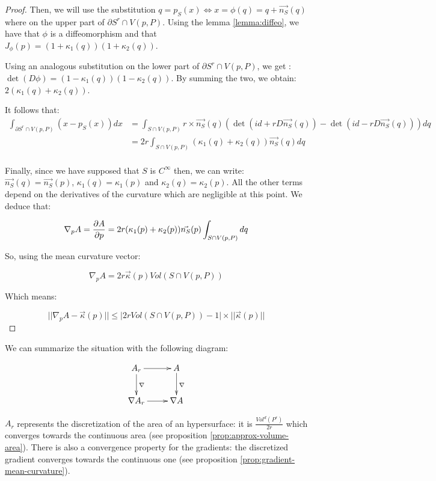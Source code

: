 \begin{proof}
Then, we will use the substitution $ q = p_S(x) \iff x = \phi(q) = q +
\vec{n_S}(q) $ where on the upper part of $ \partial{S^r} \cap V(p, P) $. Using
the lemma \ref{lemma:diffeo}, we have that $ \phi $ is a diffeomorphism and that
$ J_\phi(p) = (1 + \kappa_1(q)) (1 + \kappa_2(q)) $.

Using an analogous substitution on the lower part of $ \partial{S^r} \cap V(p,
P) $, we get : $ \det (D \phi) = (1 - \kappa_1(q)) (1 - \kappa_2(q)) $. By
summing the two, we obtain: $ 2 (\kappa_1(q) + \kappa_2(q)) $.

It follows that:
\begin{align*}
    \int_{\partial{S^r} \cap V(p, P)} (x - p_S(x)) dx &= \int_{S \cap V(p, P)}
    r \times \vec{n_S}(q) ( \det (id + r D \vec{n_S}(q)) - \det (id - r D
    \vec{n_S}(q)) ) dq \\
    &= 2r \int_{S \cap V(p, P)} (\kappa_1(q) + \kappa_2(q)) \vec{n_S}(q) dq \\
\end{align*}

Finally, since we have supposed that $ S $ is $ C^{\infty} $ then, we can write:
$ \vec{n_S}(q) = \vec{n_S}(p) $, $ \kappa_1(q) = \kappa_1(p) $ and $ \kappa_2(q)
= \kappa_2(p) $. All the other terms depend on the derivatives of the curvature
which are negligible at this point. We deduce that:

$$ \nabla_p A = \frac{\partial{A}}{\partial{p}} = 2r (\kappa_1(p) + \kappa_2(p)) \vec{n_S}(p)
\int_{S \cap V(p, P)} dq $$

So, using the mean curvature vector:

$$ \nabla_p A = 2r \vec{\kappa}(p) Vol(S \cap V(p, P)) $$

Which means:

$$ ||\nabla_p A - \vec{\kappa}(p) || \leq | 2r Vol(S \cap V(p, P)) - 1 |
\times|| \vec{\kappa}(p) ||$$

\end{proof}

We can summarize the situation with the following diagram:

\begin{displaymath}
    \xymatrix{A_r \ar[d]^{\nabla} \ar[r] & A \ar[d]^{\nabla} \\
        \nabla A_r \ar[r] & \nabla A }
\end{displaymath}

$ A_r $ represents the discretization of the area of an hypersurface: it
is $ \frac{Vol^d(P^r)}{2r} $ which converges towards the continuous area (see
proposition \ref{prop:approx-volume-area}). There is also a convergence property
for the gradients: the discretized gradient converges towards the continuous one
(see proposition \ref{prop:gradient-mean-curvature}).

